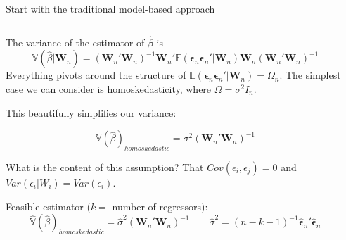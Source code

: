 \documentclass[notes,11pt, aspectratio=169]{beamer}
\newenvironment{wideitemize}{\itemize\addtolength{\itemsep}{10pt}}{\enditemize}
\begin{document}
\begin{frame}{Start with the traditional model-based approach}
\begin{columns}[T] %
\begin{column}{.8\textwidth}
  \begin{wideitemize}
  \item The variance of the estimator of $\hat{\beta}$ is
    \begin{equation}
      \mathbb{V}(\hat{\beta} |\mathbf{W}_{n}) = (\mathbf{W}_{n}'\mathbf{W}_{n})^{-1}\mathbf{W}_{n}'\mathbb{E}(\boldsymbol{\epsilon}_{n}\boldsymbol{\epsilon}_{n}'|\mathbf{W}_{n})\mathbf{W}_{n} (\mathbf{W}_{n}'\mathbf{W}_{n})^{-1}
    \end{equation}
    Everything pivots around the structure of
    $\mathbb{E}(\boldsymbol{\epsilon}_{n}\boldsymbol{\epsilon}_{n}'|\mathbf{W}_{n}) = \Omega_{n}$. The simplest case we can consider is homoskedasticity, where $\Omega = \sigma^{2}I_{n}$.
    \item This beautifully simplifies our variance:
    
    \begin{equation}
      \mathbb{V}(\hat{\beta})_{homoskedastic} = \sigma^{2} (\mathbf{W}_{n}'\mathbf{W}_{n})^{-1}
    \end{equation}
  \item What is the content of this assumption? That $Cov(\epsilon_{i},\epsilon_{j}) = 0$ and  $Var(\epsilon_{i} |W_{i}) = Var(\epsilon_{i})$.
  \item Feasible estimator ($k =$ number of regressors):
    \begin{equation}
      \hat{\mathbb{V}}(\hat{\beta})_{homoskedastic} = \hat{\sigma}^{2} (\mathbf{W}_{n}'\mathbf{W}_{n})^{-1}  \qquad \hat{\sigma}^{2} = (n-k-1)^{-1}\boldsymbol{\hat{\epsilon}}_{n}' \boldsymbol{\hat{\epsilon}}_{n} 
    \end{equation}
  \end{wideitemize}
  \end{column}%
  \hfill%
  \begin{column}{.5\textwidth}
  \end{column}
\end{columns}
  
\end{frame}
\end{document}
